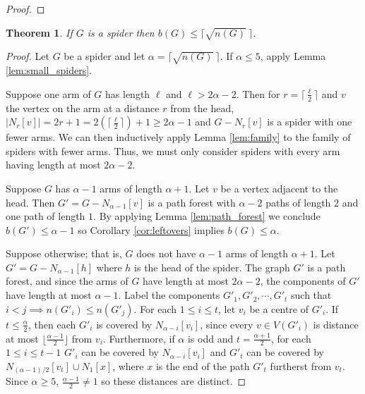 \documentclass[12pt]{article}
\newtheorem{theorem}{Theorem}[section]
\begin{document}
\begin{proof}
\end{proof}

\begin{theorem} \label{thm:main}
    If $G$ is a spider then $b(G) \leq \lceil \sqrt{n(G)}\ \rceil$.
\end{theorem}
\begin{proof}
    Let $G$ be a spider and let $\alpha = \lceil \sqrt{n(G)}\ \rceil$.
    If $\alpha \leq 5$, apply Lemma \ref{lem:small_spiders}.

    Suppose one arm of $G$ has length $\ell$ and $\ell > 2\alpha - 2$.
    Then for $r = \lceil \frac{\ell}{2} \rceil$ and $v$ the vertex on the arm at a distance $r$ from the head, $|N_r[v]| = 2r + 1 = 2(\lceil \frac{\ell}{2} \rceil) + 1 \geq 2\alpha - 1$ and $G - N_r[v]$ is a spider with one fewer arms.
    We can then inductively apply Lemma \ref{lem:family} to the family of spiders with fewer arms.
    Thus, we must only consider spiders with every arm having length at most $2\alpha - 2$.
    
    Suppose $G$ has $\alpha - 1$ arms of length $\alpha + 1$.
    Let $v$ be a vertex adjacent to the head.
    Then $G' = G - N_{\alpha - 1}[v]$ is a path forest with $\alpha - 2$ paths of length $2$ and one path of length $1$.
    By applying Lemma \ref{lem:path_forest} we conclude $b(G') \leq \alpha - 1$ so Corollary \ref{cor:leftovers} implies $b(G) \leq \alpha$.

    Suppose otherwise; that is, $G$ does not have $\alpha - 1$ arms of length $\alpha + 1$.
    Let $G' = G - N_{\alpha - 1}[h]$ where $h$ is the head of the spider.
    The graph $G'$ is a path forest, and since the arms of $G$ have length at most $2\alpha - 2$, the components of $G'$ have length at most $\alpha - 1$.
    Label the components $G'_1, G'_2, \dotsb , G'_t$ such that $i < j \implies n(G'_i) \leq n(G'_j)$.
    For each $1 \leq i \leq t$, let $v_i$ be a centre of $G'_i$.
    If $t \leq \frac{\alpha}{2}$, then each $G'_i$ is covered by $N_{\alpha - i}[v_i]$, since every $v \in V(G'_i)$ is distance at most $\lfloor \frac{\alpha - 1}{2} \rfloor$ from $v_i$.
    Furthermore, if $\alpha$ is odd and $t = \frac{\alpha + 1}{2}$, for each $1 \leq i \leq t-1$ $G'_i$ can be covered by $N_{\alpha-i}[v_i]$ and $G'_{t}$ can be covered by $N_{(\alpha - 1) \slash 2}[v_t] \cup N_{1}[x]$, where $x$ is the end of the path $G'_t$ furtherst from $v_t$.
    Since $\alpha \geq 5$, $\frac{\alpha - 1}{2} \neq 1$ so these distances are distinct.


\end{proof}
\end{document}

